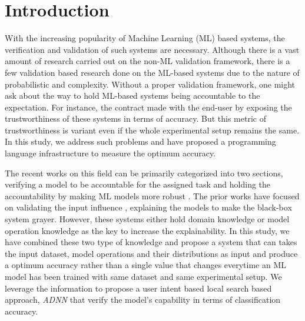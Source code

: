 
\section{Introduction}
With the increasing popularity of Machine Learning (ML) based systems, the verification and validation of such systems are necessary. Although there is a vast amount of research carried out on the non-ML validation framework, there is a few validation based research done on the ML-based systems due to the nature of probabilistic and complexity. Without a proper validation framework, one might ask about the way to hold ML-based systems being accountable to the expectation. For instance, the contract made with the end-user by exposing the trustworthiness of these systems in terms of accuracy. But this metric of trustworthiness is variant even if the whole experimental setup remains the same. In this study, we address such problems and have proposed a programming language infrastructure to measure the optimum accuracy.

The recent works on this field can be primarily categorized into two sections, verifying a model to be accountable for the assigned task \cite{pulina2010abstraction,gehr2018ai2,du2018techniques,abdul2018trends,zhang2016understanding}  and holding the accountability by making ML models more robust \cite{wang2018formal,katz2017reluplex,jia2019taso}. The prior works have focused on validating the input influence \cite{datta2016algorithmic}, explaining the models to make the black-box system grayer. However, these systems either hold domain knowledge or model operation knowledge as the key to increase the explainability. In this study, we have combined these two type of knowledge and propose a system that can takes the input dataset, model operations and their distributions as input and produce a optimum accuracy rather than a single value that changes everytime an ML model has been trained with same dataset and same experimental setup. 
We leverage the information to propose a user intent based local search based approach, \emph{ADNN} that verify the model's capability in terms of classification accuracy.

